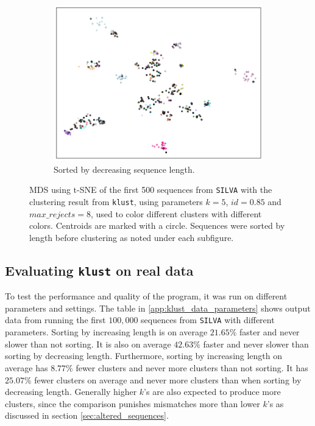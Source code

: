 \clearpage
\begin{figure}[H]
  \ContinuedFloat
  \begin{subfigure}[b]{1.0\textwidth}
    \includegraphics[width=1.0\textwidth]{graphics/SILVA_t-SNE_decr_sort_500.png}
    \caption{Sorted by decreasing sequence length.}
    \label{fig:mds_silva_sort_decr}
  \end{subfigure}
  \caption{MDS using t-SNE of the first 500 sequences from \texttt{SILVA} with
    the clustering result from \texttt{klust}, using parameters $k=5$,
    $id=0.85$ and $max\_rejects=8$, used to color different clusters with
    different colors. Centroids are marked with a circle. Sequences were sorted
    by length before clustering as noted under each subfigure.}
  \label{fig:mds_silva}
\end{figure}



\subsection{Evaluating \texttt{klust} on real data}

To test the performance and quality of the program, it was run on different
parameters and settings. The table in \ref{app:klust_data_parameters} shows
output data from running the first $100,000$ sequences from \texttt{SILVA}
with different parameters. Sorting by increasing length is on average
$21.65\%$ faster and never slower than not sorting. It is also on average
$42.63\%$ faster and never slower than sorting by decreasing length.
Furthermore, sorting by increasing length on average has $8.77\%$ fewer
clusters and never more clusters than not sorting. It has $25.07\%$ fewer
clusters on average and never more clusters than when sorting by decreasing
length. Generally higher $k$'s are also expected to produce more clusters,
since the comparison punishes mismatches more than lower $k$'s as discussed in
section \ref{sec:altered_sequences}.

